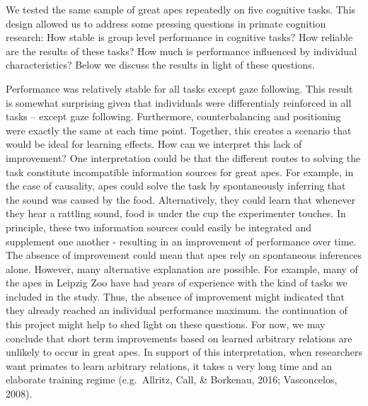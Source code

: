 \documentclass[10pt, letterpaper]{article}
\begin{document}
We tested the same sample of great apes repeatedly on five cognitive
tasks. This design allowed us to address some pressing questions in
primate cognition research: How stable is group level performance in
cognitive tasks? How reliable are the results of these tasks? How much
is performance influenced by individual characteristics? Below we
discuss the results in light of these questions.

Performance was relatively stable for all tasks except gaze following.
This result is somewhat surprising given that individuals were
differentialy reinforced in all tasks -- except gaze following.
Furthermore, counterbalancing and positioning were exactly the same at
each time point. Together, this creates a scenario that would be ideal
for learning effects. How can we interpret this lack of improvement? One
interpretation could be that the different routes to solving the task
constitute incompatible information sources for great apes. For example,
in the case of causality, apes could solve the task by spontaneously
inferring that the sound was caused by the food. Alternatively, they
could learn that whenever they hear a rattling sound, food is under the
cup the experimenter touches. In principle, these two information
sources could easily be integrated and supplement one another -
resulting in an improvement of performance over time. The absence of
improvement could mean that apes rely on spontaneous inferences alone.
However, many alternative explanation are possible. For example, many of
the apes in Leipzig Zoo have had years of experience with the kind of
tasks we included in the study. Thus, the absence of improvement might
indicated that they already reached an individual performance maximum.
the continuation of this project might help to shed light on these
questions. For now, we may conclude that short term improvements based
on learned arbitrary relations are unlikely to occur in great apes. In
support of this interpretation, when researchers want primates to learn
arbitrary relations, it takes a very long time and an elaborate training
regime (e.g.~Allritz, Call, \& Borkenau, 2016; Vasconcelos, 2008).
\end{document}
